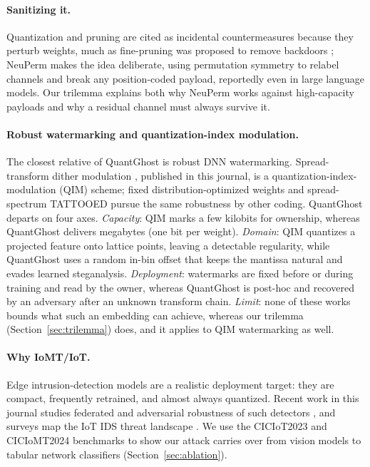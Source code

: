 \documentclass[10pt,journal]{IEEEtran}
\theoremstyle{remark}
\newcommand{\sys}{\mbox{QuantGhost}}
\begin{document}
\paragraph{Sanitizing it.} Quantization and pruning are cited as incidental
countermeasures because they perturb weights, much as fine-pruning was proposed to
remove backdoors \cite{liu2018finepruning}; NeuPerm \cite{gilkarov2025neuperm} makes
the idea deliberate, using permutation symmetry to relabel channels and break any
position-coded payload, reportedly even in large language models. Our trilemma explains
both why NeuPerm works against high-capacity payloads and why a residual channel must
always survive it.

\paragraph{Robust watermarking and quantization-index modulation.} The closest relative
of \sys{} is robust DNN watermarking. Spread-transform dither modulation \cite{li2021stdm},
published in this journal, is a quantization-index-modulation (QIM) scheme; fixed
distribution-optimized weights \cite{tondi2022robust} and spread-spectrum TATTOOED
\cite{pagnotta2022tattooed} pursue the same robustness by other coding. \sys{} departs on
four axes. \emph{Capacity}: QIM marks a few kilobits for ownership, whereas \sys{}
delivers megabytes (one bit per weight). \emph{Domain}: QIM quantizes a projected feature
onto lattice points, leaving a detectable regularity, while \sys{} uses a random in-bin
offset that keeps the mantissa natural and evades learned steganalysis. \emph{Deployment}:
watermarks are fixed before or during training and read by the owner, whereas \sys{} is
post-hoc and recovered by an adversary after an unknown transform chain. \emph{Limit}:
none of these works bounds what such an embedding can achieve, whereas our trilemma
(Section~\ref{sec:trilemma}) does, and it applies to QIM watermarking as well.

\paragraph{Why IoMT/IoT.} Edge intrusion-detection models are a realistic deployment
target: they are compact, frequently retrained, and almost always quantized. Recent
work in this journal studies federated and adversarial robustness of such detectors
\cite{vadigi2023federated,yasarathna2025sok,sameera2025weidetect}, and surveys map the
IoT IDS threat landscape \cite{aydin2025idsiot}. We use the CICIoT2023
\cite{neto2023ciciot2023} and CICIoMT2024 \cite{dadkhah2024ciciomt2024} benchmarks to
show our attack carries over from vision models to tabular network classifiers
(Section~\ref{sec:ablation}).
\end{document}
